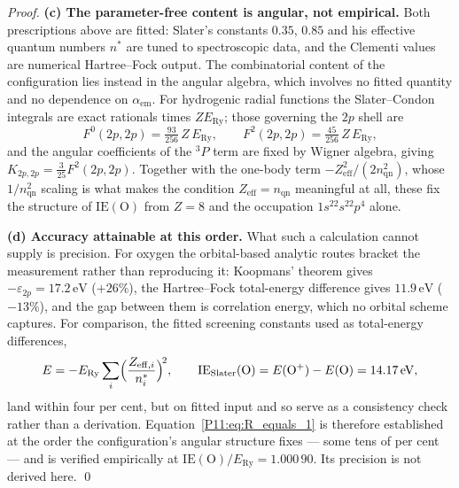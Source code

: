\documentclass[11pt,a4paper]{article}
\theoremstyle{definition}
\theoremstyle{remark}
\newcommand{\ERy}{E_{\mathrm{Ry}}}
\newcommand{\aem}{\alpha_{\mathrm{em}}}
\newcommand{\IE}{\mathrm{IE}}
\begin{document}
\begin{proof}
\textbf{(c) The parameter-free content is angular, not empirical.}
Both prescriptions above are fitted: Slater's constants $0.35$, $0.85$
and his effective quantum numbers $n^*$ are tuned to spectroscopic
data, and the Clementi values are numerical Hartree--Fock output.  The
combinatorial content of the configuration lies instead in the angular
algebra, which involves no fitted quantity and no dependence on
$\aem$.  For hydrogenic radial functions the Slater--Condon integrals
are exact rationals times $Z\ERy$; those governing the $2p$ shell are
\begin{equation}
  F^0(2p,2p) = \tfrac{93}{256}\,Z\,\ERy,
  \qquad
  F^2(2p,2p) = \tfrac{45}{256}\,Z\,\ERy,
  \label{P11:eq:slater_condon}
\end{equation}
and the angular coefficients of the $^3P$ term are fixed by Wigner
algebra, giving $K_{2p,2p} = \tfrac{3}{25}F^2(2p,2p)$.  Together with
the one-body term $-Z_\mathrm{eff}^2/(2n_\mathrm{qn}^2)$, whose
$1/n_\mathrm{qn}^2$ scaling is what makes the condition
$Z_\mathrm{eff}=n_\mathrm{qn}$ meaningful at all, these fix the
structure of $\IE(\mathrm{O})$ from $Z=8$ and the occupation
$1s^22s^22p^4$ alone.

\textbf{(d) Accuracy attainable at this order.}
What such a calculation cannot supply is precision.  For oxygen the
orbital-based analytic routes bracket the measurement rather than
reproducing it: Koopmans' theorem gives $-\varepsilon_{2p} =
17.2\,\mathrm{eV}$ ($+26\%$), the Hartree--Fock total-energy
difference gives $11.9\,\mathrm{eV}$ ($-13\%$), and the gap between
them is correlation energy, which no orbital scheme captures.  For
comparison, the fitted screening constants used as total-energy
differences,
\begin{equation}
  E = -\ERy \sum_i \Bigl(\frac{Z_{\mathrm{eff},i}}{n^*_i}\Bigr)^{\!2},
  \qquad
  \IE_\mathrm{Slater}(\mathrm{O}) = E(\mathrm{O}^+) - E(\mathrm{O})
  = 14.17\,\mathrm{eV},
  \label{P11:eq:IE_slater_total}
\end{equation}
land within four per cent, but on fitted input and so serve as a
consistency check rather than a derivation.
Equation~\eqref{P11:eq:R_equals_1} is therefore established at the
order the configuration's angular structure fixes --- some tens of per
cent --- and is verified empirically at
$\IE(\mathrm{O})/\ERy = 1.000\,90$.  Its precision is not derived
here.
\qed
\end{proof}
\end{document}
